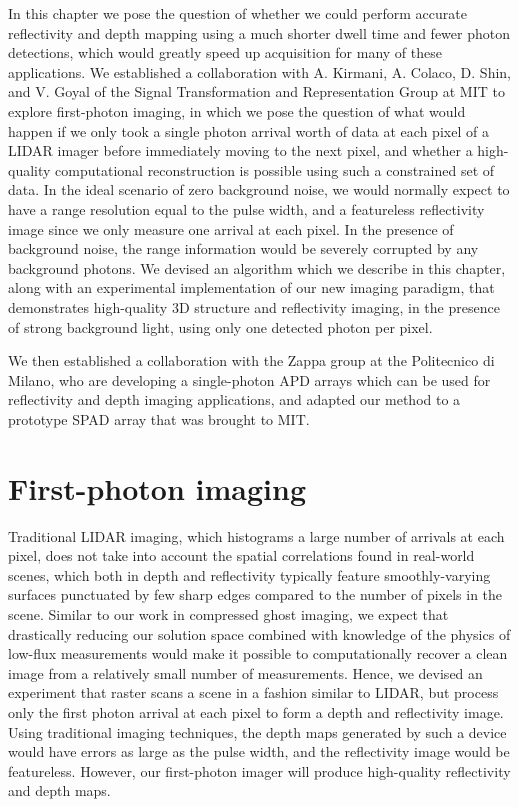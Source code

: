 In this chapter we pose the question of whether we could perform accurate reflectivity and depth mapping using a much shorter dwell time and fewer photon detections, which would greatly speed up acquisition for many of these applications. We established a collaboration with A. Kirmani, A. Colaco, D. Shin, and V. Goyal of the Signal Transformation and Representation Group at MIT to explore first-photon imaging, in which we pose the question of what would happen if we only took a single photon arrival worth of data at each pixel of a LIDAR imager before immediately moving to the next pixel, and whether a high-quality computational reconstruction is possible using such a constrained set of data. In the ideal scenario of zero background noise, we would normally expect to have a range resolution equal to the pulse width, and a featureless reflectivity image since we only measure one arrival at each pixel. In the presence of background noise, the range information would be severely corrupted by any background photons. We devised an algorithm which we describe in this chapter, along with an experimental implementation of our new imaging paradigm, that demonstrates high-quality 3D structure and reflectivity imaging, in the presence of strong background light, using only one detected photon per pixel.

We then established a collaboration with the Zappa group at the Politecnico di Milano, who are developing a single-photon APD arrays \cite{villa-spad,guerrieri-two,scarcella-low} which can be used for reflectivity and depth imaging applications, and adapted our method to a prototype SPAD array that was brought to MIT.

\section{First-photon imaging}

Traditional LIDAR imaging, which histograms a large number of arrivals at each pixel, does not take into account the spatial correlations found in real-world scenes, which both in depth and reflectivity typically feature smoothly-varying surfaces punctuated by few sharp edges compared to the number of pixels in the scene. Similar to our work in compressed ghost imaging, we expect that drastically reducing our solution space combined with knowledge of the physics of low-flux measurements would make it possible to computationally recover a clean image from a relatively small number of measurements. Hence, we devised an experiment that raster scans a scene in a fashion similar to LIDAR, but process only the first photon arrival at each pixel to form a depth and reflectivity image. Using traditional imaging techniques, the depth maps generated by such a device would have errors as large as the pulse width, and the reflectivity image would be featureless. However, our first-photon imager will produce high-quality reflectivity and depth maps.

